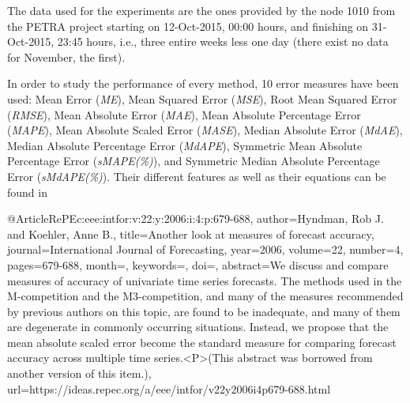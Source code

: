 The data used for the experiments are the ones provided by the node 1010 from the PETRA project starting on 12-Oct-2015, 00:00 hours, and finishing on 31-Oct-2015, 23:45 hours, i.e., three entire weeks less one day (there exist no data for November, the first).

In order to study the performance of every method, 10 error measures have been used:
Mean Error ({\em ME}),
Mean Squared Error ({\em MSE}),
Root Mean Squared Error ({\em RMSE}),
Mean Absolute Error ({\em MAE}),
Mean Absolute Percentage Error ({\em MAPE}),
Mean Absolute Scaled Error ({\em MASE}),
Median Absolute Error ({\em MdAE}),
Median Absolute Percentage Error ({\em MdAPE}),
Symmetric Mean Absolute Percentage Error ({\em sMAPE(\%)}), and
Symmetric Median Absolute Percentage Error ({\em sMdAPE(\%)}).
Their different features as well as their equations can be found in ~\cite{RePEc:eee:intfor:v:22:y:2006:i:4:p:679-688}







@Article{RePEc:eee:intfor:v:22:y:2006:i:4:p:679-688,
  author={Hyndman, Rob J. and Koehler, Anne B.},
  title={{Another look at measures of forecast accuracy}},
  journal={International Journal of Forecasting},
  year=2006,
  volume={22},
  number={4},
  pages={679-688},
  month={},
  keywords={},
  doi={},
  abstract={We discuss and compare measures of accuracy of univariate time series forecasts. The methods used in the M-competition and the M3-competition, and many of the measures recommended by previous authors on this topic, are found to be inadequate, and many of them are degenerate in commonly occurring situations. Instead, we propose that the mean absolute scaled error become the standard measure for comparing forecast accuracy across multiple time series.<P>(This abstract was borrowed from another version of this item.)},
  url={https://ideas.repec.org/a/eee/intfor/v22y2006i4p679-688.html}
}
